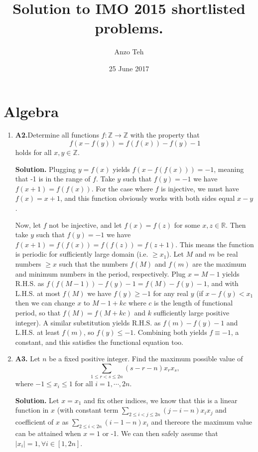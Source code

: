 \documentclass[11pt,a4paper]{article}
\begin{document}
\title{Solution to IMO 2015 shortlisted problems.}
\author{Anzo Teh}
\date{25 June 2017}
\maketitle

\section{Algebra}
\begin{enumerate}
\item\textbf{A2.}Determine all functions $f:\mathbb{Z}\rightarrow\mathbb{Z}$ with the property that \[f(x-f(y))=f(f(x))-f(y)-1\]holds for all $x,y\in\mathbb{Z}$.

\textbf{Solution.}
Plugging $y=f(x)$ yields $f(x-f(f(x)))=-1$, meaning that -1 is in the range of $f$. Take $y$ such that $f(y)=-1$ we  have $f(x+1)=f(f(x))$. For the case where $f$ is injective, we must have $f(x)=x+1$, and this function obviously works with both sides equal $x-y$.

Now, let $f$ not be injective, and let $f(x)=f(z)$ for some $x,z\in\mathbb{R}$. Then take $y$ such that $f(y)=-1$ we have $f(x+1)=f(f(x))=f(f(z))=f(z+1)$. This means the function is periodic for sufficiently large domain (i.e. $\ge x_1$). Let $M$ and $m$ be real numbers $\ge x$ such that the numbers $f(M)$ and $f(m)$ are the maximum and minimum numbers in the period, respectively. Plug $x=M-1$ yields R.H.S. as $f(f(M-1))-f(y)-1=f(M)-f(y)-1$, and with L.H.S. at most $f(M)$ we have $f(y)\ge -1$ for any real $y$ (if $x-f(y)<x_1$ then we can change $x$ to $M-1+kc$ where $c$ is the length of functional period, so that $f(M)=f(M+kc)$ and $k$ sufficiently large positive integer). A similar substitution yields R.H.S. as $f(m)-f(y)-1$ and L.H.S. at least $f(m)$, so $f(y)\le -1$. Combining both yields $f\equiv -1$, a constant, and this satisfies the functional equation too.

\item\textbf{A3.} Let $n$ be a fixed positive integer. Find the maximum possible value of \[ \sum_{1 \le r < s \le 2n} (s-r-n)x_rx_s, \]where $-1 \le x_i \le 1$ for all $i = 1, \cdots , 2n$.

\textbf{Solution.} Let $x=x_1$ and fix other indices, we know that this is a linear function in $x$ (with constant term $\displaystyle\sum_{2\le i<j\le 2n} (j-i-n)x_ix_j$ and coefficient of $x$ as $\displaystyle\sum_{2\le i< 2n} (i-1-n)x_i$ and thereore the maximum value can be attained when $x=1$ or -1. We can then safely assume that $\mid x_i\mid =1, \forall i\in[1,2n]$.


\end{enumerate}
\end{document}
